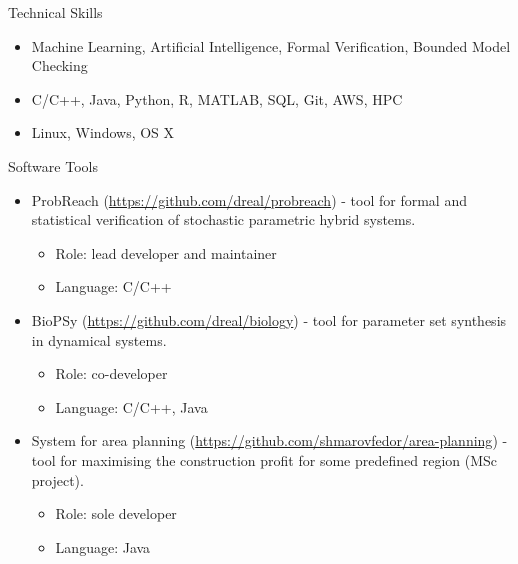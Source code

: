 \documentclass{resume} %
\begin{document}
\pagebreak

\begin{rSection}{Technical Skills}
\begin{itemize}
	\item Machine Learning, Artificial Intelligence, Formal Verification, Bounded Model Checking
	\item C/C++, Java, Python, R, MATLAB, SQL, Git, AWS, HPC
	\item Linux, Windows, OS X
\end{itemize}
\end{rSection}



\begin{rSection}{Software Tools}
\begin{itemize}
	\item ProbReach (\url{https://github.com/dreal/probreach}) - tool for formal and statistical
	verification of stochastic parametric hybrid systems.
	\begin{itemize}
		\item Role: lead developer and maintainer
		\item Language: C/C++
	\end{itemize}
	\item BioPSy (\url{https://github.com/dreal/biology}) - tool for parameter set synthesis
	in dynamical systems.
	\begin{itemize}
		\item Role: co-developer
		\item Language: C/C++, Java
	\end{itemize}
	\item System for area planning (\url{https://github.com/shmarovfedor/area-planning}) - 
	tool for maximising the construction profit for some predefined region (MSc project).
	\begin{itemize}
		\item Role: sole developer
		\item Language: Java
	\end{itemize}
\end{itemize}
\end{rSection}
\end{document}
